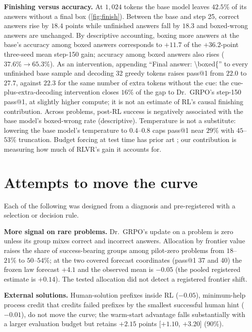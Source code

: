 \documentclass{article}
\theoremstyle{plain}
\begin{document}
\textbf{Finishing versus accuracy.} At $1{,}024$ tokens the base model leaves $42.5\%$ of its answers without a final box (\cref{fig:finish}). Between the base and step 25, correct answers rise by $18.4$ points while unfinished answers fall by $18.3$ and boxed-wrong answers are unchanged. By descriptive accounting, boxing more answers at the base's accuracy among boxed answers corresponds to $+11.7$ of the $+36.2$-point three-seed mean step-150 gain; accuracy among boxed answers also rises ($37.6\%\to65.3\%$). As an intervention, appending ``Final answer: \textbackslash boxed\{'' to every unfinished base sample and decoding 32 greedy tokens raises pass@1 from $22.0$ to $27.7$, against $22.3$ for the same number of extra tokens without the cue: the cue-plus-extra-decoding intervention closes $16\%$ of the gap to Dr.\ GRPO's step-150 pass@1, at slightly higher compute; it is not an estimate of RL's causal finishing contribution. Across problems, post-RL success is negatively associated with the base model's boxed-wrong rate (descriptive). Temperature is not a substitute: lowering the base model's temperature to $0.4$--$0.8$ caps pass@1 near $29\%$ with $45$--$53\%$ truncation. Budget forcing at test time has prior art \citep{muennighoff2025s1}; our contribution is measuring how much of RLVR's gain it accounts for.

\section{Attempts to move the curve}\label{sec:attempts}
Each of the following was designed from a diagnosis and pre-registered with a selection or decision rule.

\textbf{More signal on rare problems.} Dr.\ GRPO's update on a problem is zero unless its group mixes correct and incorrect answers. Allocation by frontier value raises the share of success-bearing groups among pilot-zero problems from $18$--$21\%$ to $50$--$54\%$; at the two covered forecast coordinates (pass@1 37 and 40) the frozen law forecast $+4.1$ and the observed mean is $-0.05$ (the pooled registered estimate is $+0.14$). The tested allocation did not detect a registered frontier shift.

\textbf{External solutions.} Human-solution prefixes inside RL ($-0.05$), minimum-help process credit that credits failed prefixes by the smallest successful human hint ($-0.01$), do not move the curve; the warm-start advantage falls substantially with a larger evaluation budget but retains $+2.15$ points [$+1.10$, $+3.20$] (90\%).
\end{document}
